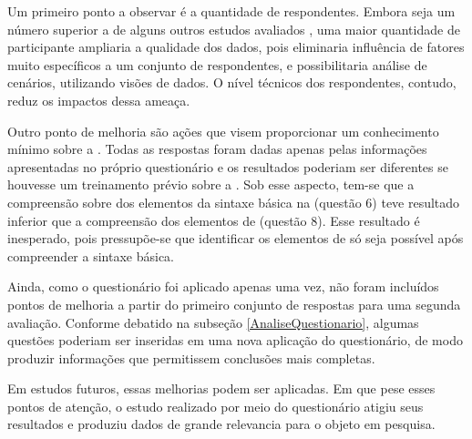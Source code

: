 Um primeiro ponto a observar é a quantidade de respondentes. Embora seja um
número superior a de alguns outros estudos avaliados
\cite{albuquerque2015quantifying}
\cite{hernandes2010avaliaccao} \cite{laitenberger1998evaluating}, uma maior
quantidade de participante ampliaria a qualidade dos dados, pois eliminaria influência de fatores muito
específicos a um conjunto de respondentes, e possibilitaria análise de 
cenários, utilizando visões de dados. O nível técnicos dos respondentes,
contudo, reduz os impactos dessa ameaça.

Outro ponto de melhoria são ações que visem proporcionar um conhecimento mínimo
sobre a \neoidl{}. Todas as respostas foram dadas apenas pelas informações
apresentadas no próprio questionário e os resultados poderiam ser diferentes se
houvesse um treinamento prévio sobre a \neoidl{}. Sob esse aspecto, tem-se que a
compreensão sobre dos elementos da sintaxe básica na \neoidl{} (questão 6) teve
resultado inferior que a compreensão dos elementos de \designbycontract{}
(questão 8). Esse resultado é inesperado, pois pressupõe-se que identificar os
elementos de \designbycontract{} só seja possível após compreender a sintaxe
básica.

Ainda, como o questionário foi aplicado apenas uma vez, não foram incluídos
pontos de melhoria a partir do primeiro conjunto de respostas para uma segunda
avaliação. Conforme debatido na subseção \ref{AnaliseQuestionario}, algumas
questões poderiam ser inseridas em uma nova aplicação do questionário, de
modo produzir informações que permitissem conclusões mais completas.

Em estudos futuros, essas melhorias podem ser aplicadas. Em que pese esses
pontos de atenção, o estudo realizado por meio do questionário atigiu seus
resultados e produziu dados de grande relevancia para o objeto em pesquisa.


